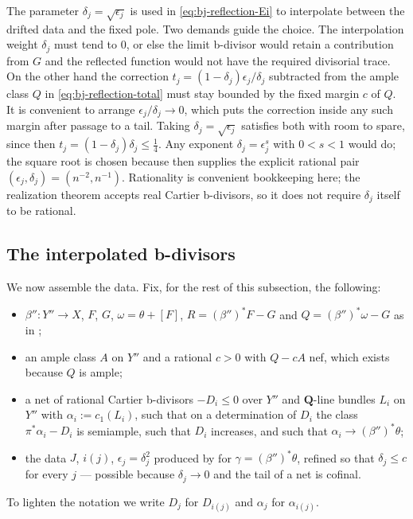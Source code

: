 \begin{remark}
\label{rem:ch39-why-square}
The parameter $\delta_j=\sqrt{\epsilon_j}$ is used in
\eqref{eq:bj-reflection-Ei} to interpolate between the drifted data and the
fixed pole.  Two demands guide the choice.  The interpolation
weight $\delta_j$ must tend to $0$, or else the limit b-divisor would
retain a contribution from $G$ and the reflected function would not have
the required divisorial trace.  On the other hand the correction
$t_j=(1-\delta_j)\epsilon_j/\delta_j$ subtracted from the ample class
$Q$ in \eqref{eq:bj-reflection-total} must stay bounded by the fixed
margin $c$ of $Q$.  It is convenient to arrange
$\epsilon_j/\delta_j\to0$, which puts the correction inside any such
margin after passage to a tail.  Taking
$\delta_j=\sqrt{\epsilon_j}$ satisfies both with room to spare, since then
$t_j=(1-\delta_j)\delta_j\le\frac14$.  Any exponent
$\delta_j=\epsilon_j^{s}$ with $0<s<1$ would do; the square root is
chosen because  then supplies the explicit
rational pair $(\epsilon_j,\delta_j)=(n^{-2},n^{-1})$.
Rationality is convenient bookkeeping here; the realization theorem
accepts real Cartier b-divisors, so it does not require $\delta_j$ itself
to be rational.
\end{remark}

\subsection{The interpolated b-divisors}
\label{sec:ch39-interpolation}

We now assemble the data.  Fix, for the rest of this subsection, the
following:
\begin{itemize}
\item $\beta'':Y''\to X$, $F$, $G$, $\omega=\theta+[F]$,
 $R=(\beta'')^*F-G$ and $Q=(\beta'')^*\omega-G$ as in
 ;
\item an ample class $A$ on $Y''$ and a rational $c>0$ with
 $Q-cA$ nef, which exists because $Q$ is ample;
\item a net of rational Cartier b-divisors $-D_i\le0$ over $Y''$ and
 $\mathbf Q$-line bundles $L_i$ on $Y''$ with
 $\alpha_i:=c_1(L_i)$, such that on a determination of $D_i$ the class
 $\pi^*\alpha_i-D_i$ is semiample, such that $D_i$ increases, and such
 that $\alpha_i\to(\beta'')^*\theta$;
\item the data $J$, $i(j)$, $\epsilon_j=\delta_j^2$ produced by
  for $\gamma=(\beta'')^*\theta$, refined so
 that $\delta_j\le c$ for every $j$ --- possible because
 $\delta_j\to0$ and the tail of a net is cofinal.
\end{itemize}
To lighten the notation we write $D_j$ for $D_{i(j)}$ and
$\alpha_j$ for $\alpha_{i(j)}$.


